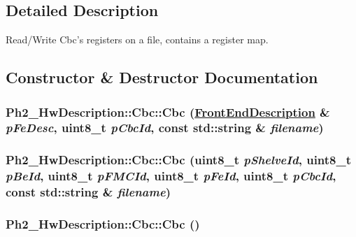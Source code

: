 \subsection{Detailed Description}
Read/Write Cbc's registers on a file, contains a register map. 



\subsection{Constructor \& Destructor Documentation}
\hypertarget{class_ph2___hw_description_1_1_cbc_f1d0b102272e6d4fabebbee4ec1c0002}{
\subsubsection[Cbc]{\setlength{\rightskip}{0pt plus 5cm}Ph2\_\-Hw\-Description::Cbc::Cbc (\hyperlink{class_ph2___hw_description_1_1_front_end_description}{Front\-End\-Description} \& {\em p\-Fe\-Desc}, uint8\_\-t {\em p\-Cbc\-Id}, const std::string \& {\em filename})}}
\label{class_ph2___hw_description_1_1_cbc_f1d0b102272e6d4fabebbee4ec1c0002}


\hypertarget{class_ph2___hw_description_1_1_cbc_66126a536d5ba0a7148bb33627a73357}{
\subsubsection[Cbc]{\setlength{\rightskip}{0pt plus 5cm}Ph2\_\-Hw\-Description::Cbc::Cbc (uint8\_\-t {\em p\-Shelve\-Id}, uint8\_\-t {\em p\-Be\-Id}, uint8\_\-t {\em p\-FMCId}, uint8\_\-t {\em p\-Fe\-Id}, uint8\_\-t {\em p\-Cbc\-Id}, const std::string \& {\em filename})}}
\label{class_ph2___hw_description_1_1_cbc_66126a536d5ba0a7148bb33627a73357}


\hypertarget{class_ph2___hw_description_1_1_cbc_5b7124456823871d611ada17ed0a51a1}{
\subsubsection[Cbc]{\setlength{\rightskip}{0pt plus 5cm}Ph2\_\-Hw\-Description::Cbc::Cbc ()}}
\label{class_ph2___hw_description_1_1_cbc_5b7124456823871d611ada17ed0a51a1}


